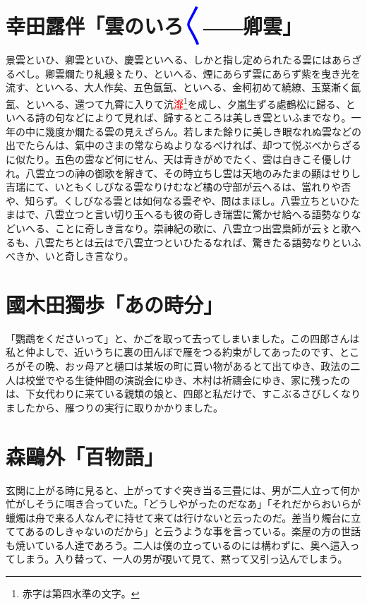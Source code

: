 \documentclass{ujarticle}
\begin{document}
\section{幸田露伴「雲のいろ\textcolor{blue}{〳〵}――卿雲」}

景雲といひ、卿雲といひ、慶雲といへる、しかと指し定められたる雲にはあらざるべし。卿雲爛たり糺縵〻たり、といへる、煙にあらず雲にあらず紫を曳き光を流す、といへる、大人作矣、五色氤氳、といへる、金柯初めて繞繚、玉葉漸く氤氳、といへる、還つて九霄に入りて沆\textcolor{red}{瀣}\footnote{赤字は第四水準の文字。}を成し、夕嵐生ずる處鶴松に歸る、といへる詩の句などによりて見れば、歸するところは美しき雲といふまでなり。一年の中に幾度か爛たる雲の見えざらん。若しまた餘りに美しき眼なれぬ雲などの出でたらんは、氣中のさまの常ならぬよりなるべければ、却つて悦ぶべからざるに似たり。五色の雲など何にせん、天は青きがめでたく、雲は白きこそ優しけれ。八雲立つの神の御歌を解きて、その時立ちし雲は天地のみたまの顯はせりし吉瑞にて、いともくしびなる雲なりけむなど橘の守部が云へるは、當れりや否や、知らず。くしびなる雲とは如何なる雲ぞや、問はまほし。八雲立ちといひたまはで、八雲立つと言い切り玉へるも彼の奇しき瑞雲に驚かせ給へる語勢なりなどいへる、ことに奇しき言なり。崇神紀の歌に、八雲立つ出雲梟師が云〻と歌へるも、八雲たちとは云はで八雲立つといひたるなれば、驚きたる語勢なりといふべきか、いと奇しき言なり。


\section{國木田獨歩「あの時分」}

「鸚鵡をくださいって」と、かごを取って去ってしまいました。この四郎さんは私と仲よしで、近いうちに裏の田んぼで雁をつる約束がしてあったのです、ところがその晩、おッ母アと樋口は某坂の町に買い物があるとて出てゆき、政法の二人は校堂でやる生徒仲間の演説会にゆき、木村は祈禱会にゆき、家に残ったのは、下女代わりに来ている親類の娘と、四郎と私だけで、すこぶるさびしくなりましたから、雁つりの実行に取りかかりました。


\section{森鷗外「百物語」}

玄関に上がる時に見ると、上がってすぐ突き当る三畳には、男が二人立って何か忙がしそうに咡き合っていた。「どうしやがったのだなあ」「それだからおいらが蠟燭は舟で来る人なんぞに持せて来ては行けないと云ったのだ。差当り燭台に立ててあるのしきゃないのだから」と云うような事を言っている。楽屋の方の世話も焼いている人達であろう。二人は僕の立っているのには構わずに、奥へ這入ってしまう。入り替って、一人の男が覗いて見て、黙って又引っ込んでしまう。
\end{document}
